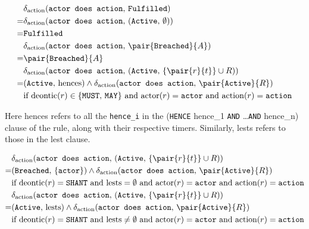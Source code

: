 \documentclass{article}
\begin{document}
\begin{align*}
  & \delta_\text{action}(
    \texttt{actor does action}, \,
    \texttt{Fulfilled}
  )
  \\
  = & \delta_\text{action}(
    \texttt{actor does action}, \,
    (\texttt{Active}, \, \emptyset)
  )
  \\
  = & \texttt{Fulfilled}
  \\
  & \delta_\text{action}(
    \texttt{actor does action}, \,
    \pair{\texttt{Breached}}{A}
  )
  \\
  = & \pair{\texttt{Breached}}{A}
  \\
  & \delta_\text{action}(
    \texttt{actor does action}, \,
    (
      \texttt{Active}, \,
      \{\pair{r}{t}\} \cup R
    )
  )
  \\
  = &
  (
    \texttt{Active}, \,
    \text{hences}
  )
  \wedge
  \delta_\text{action}(\texttt{actor does action}, \, \pair{\texttt{Active}}{R})
  \\
  & \text{if deontic}(r) \in \{\texttt{MUST}, \, \texttt{MAY}\}
  \text{ and } \text{actor}(r) = \texttt{actor}
  \text{ and } \text{action}(r) = \texttt{action}
\end{align*}

Here hences refers to all the \texttt{hence\_i} in the
(\texttt{HENCE} hence\_1 \texttt{AND} \dots \texttt{AND} hence\_n)
clause of the rule, along with their respective timers.
Similarly, lests refers to those in the lest clause.

\begin{align*}
  & \delta_\text{action}(
    \texttt{actor does action}, \,
    (
      \texttt{Active}, \,
      \{\pair{r}{t}\} \cup R
    )
  )
  \\
  = &
  (
    \texttt{Breached}, \,
    \{\texttt{actor}\}
  )
  \wedge
  \delta_\text{action}(\texttt{actor does action}, \, \pair{\texttt{Active}}{R})
  \\
  & \text{if deontic}(r) = \texttt{SHANT} \text{ and lests} = \emptyset
  \text{ and } \text{actor}(r) = \texttt{actor}
  \text{ and } \text{action}(r) = \texttt{action}
  \\
  & \delta_\text{action}(
    \texttt{actor does action}, \,
    (
      \texttt{Active}, \,
      \{\pair{r}{t}\} \cup R
    )
  )
  \\
  = &
  (
    \texttt{Active}, \,
    \text{lests}
  )
  \wedge
  \delta_\text{action}(\texttt{actor does action}, \, \pair{\texttt{Active}}{R})
  \\
  & \text{if deontic}(r) = \texttt{SHANT} \text{ and lests} \neq \emptyset
  \text{ and } \text{actor}(r) = \texttt{actor}
  \text{ and } \text{action}(r) = \texttt{action}
\end{align*}
\end{document}
